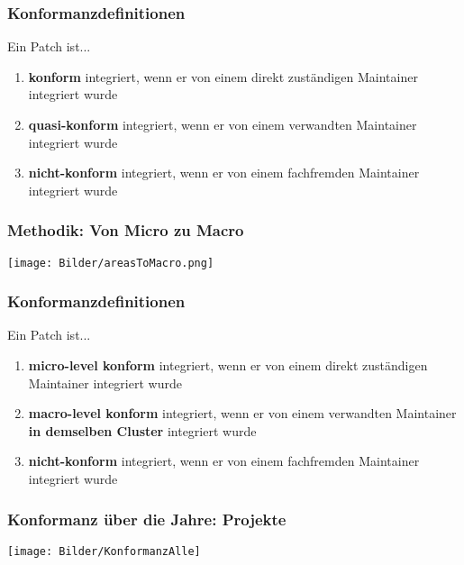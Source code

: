 \documentclass{beamer}
\begin{document}
	\begin{frame}
	\frametitle{Konformanzdefinitionen}
		\begin{block}{Ein Patch ist...}
			\begin{enumerate}
				\item \textbf{konform} integriert, wenn er von einem direkt zuständigen Maintainer integriert wurde
				\item \textbf{quasi-konform} integriert, wenn er von einem verwandten Maintainer integriert wurde
				\item \textbf{nicht-konform} integriert, wenn er von einem fachfremden Maintainer integriert wurde
			\end{enumerate}
		\end{block}
	\end{frame}

	\begin{frame}
	\frametitle{Methodik: Von Micro zu Macro}
	\centering
	\texttt{[image: Bilder/areasToMacro.png]}
	\end{frame}


	\begin{frame}
	\frametitle{Konformanzdefinitionen}
		\begin{block}{Ein Patch ist...}
			\begin{enumerate}
				\item \textbf{micro-level konform} integriert, wenn er von einem direkt zuständigen Maintainer integriert wurde
				\item \textbf{macro-level konform} integriert, wenn er von einem verwandten Maintainer \textbf{in demselben Cluster} integriert wurde
				\item \textbf{nicht-konform} integriert, wenn er von einem fachfremden Maintainer integriert wurde
			\end{enumerate}
		\end{block}

	\end{frame}



	\begin{frame}
	\frametitle{Konformanz über die Jahre: Projekte}
	\centering
	\texttt{[image: Bilder/KonformanzAlle]}
	\end{frame}
\end{document}
